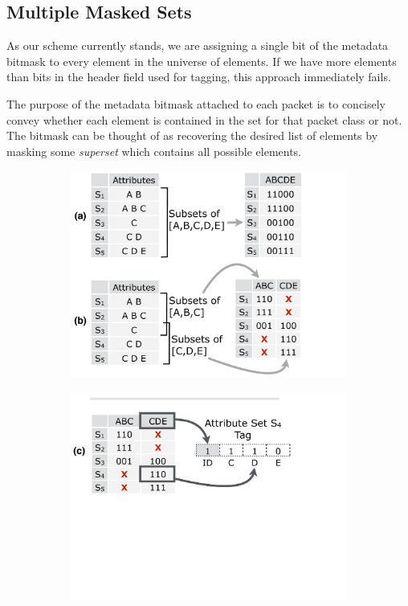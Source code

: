 \subsection{Multiple Masked Sets}

 As our scheme currently stands, we are assigning a single bit of the metadata bitmask to every
element in the universe of elements. If we have more elements than bits in the header field used for tagging, this approach immediately fails.

The purpose of the metadata bitmask attached to each packet is to concisely convey whether each element is contained in the set for that packet class or not. The bitmask can be thought of as recovering the desired list of elements by masking some \textit{superset} which contains all possible elements. 

\begin{figure}[t!] 
\begin{minipage}{1\linewidth}
\begin{subfigure}[b]{0.96\linewidth}
\includegraphics[trim={0 0 5.5cm 0}, clip, width=\linewidth]{figures/masking}
\end{subfigure} 
\begin{subfigure}[c]{0.96\linewidth}
\includegraphics[trim={0 13cm 5.5cm 0}, clip, width=\linewidth]{figures/making_metadata}

\end{subfigure}
\end{minipage}
\end{figure}
